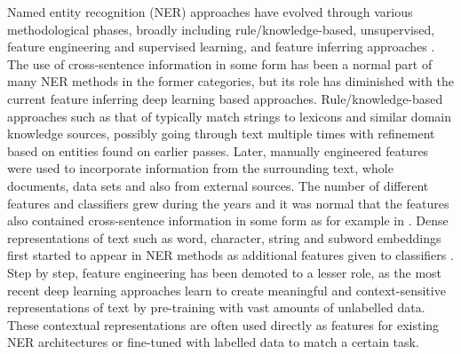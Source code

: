 \documentclass[11pt]{article}
\begin{document}
Named entity recognition (NER) approaches have evolved through various methodological phases, broadly including rule/knowledge-based, unsupervised, feature engineering and supervised learning, and feature inferring approaches \cite{yadav-bethard-2018-survey,Li_2020}. The use of cross-sentence information in some form has been a normal part of many NER methods in the former categories, but its role has diminished with the current feature inferring deep learning based approaches. Rule/knowledge-based approaches such as that of  typically match strings to lexicons and similar domain knowledge sources, possibly going through text multiple times with refinement based on entities found on earlier passes. Later, manually engineered features were used to incorporate information from the surrounding text, whole documents, data sets and also from external sources. The number of different features and classifiers grew during the years and it was normal that the features also contained cross-sentence information in some form as for example in \cite{krishnan-manning-2006-effective}. Dense representations of text such as word, character, string and subword embeddings first started to appear in NER methods as additional features given to classifiers \cite{collobert2011}. Step by step, feature engineering has been demoted to a lesser role, as the most recent deep learning approaches learn to create meaningful and context-sensitive representations of text by pre-training with vast amounts of unlabelled data. These contextual representations are often used directly as features for existing NER architectures or fine-tuned with labelled data to match a certain task. 

\end{document}
